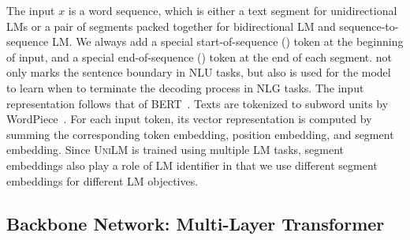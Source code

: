 \documentclass{article}
\newcommand\ours{\textsc{UniLM}}
\begin{document}
The input $x$ is a word sequence, which is either a text segment for unidirectional LMs or a pair of segments packed together for bidirectional LM and sequence-to-sequence LM. 
We always add a special start-of-sequence () token at the beginning of input, and a special end-of-sequence () token at the end of each segment. 
 not only marks the sentence boundary in NLU tasks, but also is used for the model to learn when to terminate the decoding process in NLG tasks.
The input representation follows that of BERT~\cite{bert}.
Texts are tokenized to subword units by WordPiece~\cite{gnmt}.
For each input token, its vector representation is computed by summing the corresponding token embedding, position embedding, and segment embedding.
Since \ours{} is trained using multiple LM tasks, segment embeddings also play a role of LM identifier in that we use different segment embeddings for different LM objectives. 


\subsection{Backbone Network: Multi-Layer Transformer}
\end{document}
